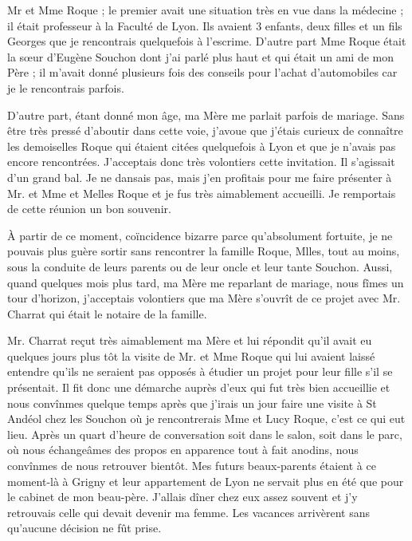 \documentclass[11pt,a4paper]{report}
\begin{document}
Mr et Mme Roque ; le premier avait une situation très en vue dans la médecine ; il était professeur à la Faculté de Lyon. Ils avaient 3 enfants, deux filles et un fils Georges que je rencontrais quelquefois à l'escrime. D'autre part Mme Roque était la sœur d'Eugène Souchon dont j'ai parlé plus haut et qui était un ami de mon Père ; il m'avait donné plusieurs fois des conseils pour l'achat d'automobiles car je le rencontrais parfois.

D'autre part, étant donné mon âge, ma Mère me parlait parfois de mariage. Sans être très pressé d'aboutir dans cette voie, j'avoue que j'étais curieux de connaître les demoiselles Roque qui étaient citées quelquefois à Lyon et que je n'avais pas encore rencontrées. J'acceptais donc très volontiers cette invitation. Il s'agissait d'un grand bal. Je ne dansais pas, mais j'en profitais pour me faire présenter à Mr. et Mme et Melles Roque et je fus très aimablement accueilli. Je remportais de cette réunion un bon souvenir.

À partir de ce moment, coïncidence bizarre parce qu'absolument fortuite, je ne pouvais plus guère sortir sans rencontrer la famille Roque, Mlles, tout au moins, sous la conduite de leurs parents ou de leur oncle et leur tante Souchon. Aussi, quand quelques mois plus tard, ma Mère me reparlant de mariage, nous fîmes un tour d'horizon, j'acceptais volontiers que ma Mère s'ouvrît de ce projet avec Mr. Charrat qui était le notaire de la famille.

Mr. Charrat reçut très aimablement ma Mère et lui répondit qu'il avait eu quelques jours plus tôt la visite de Mr. et Mme Roque qui lui avaient laissé entendre qu'ils ne seraient pas opposés à étudier un projet pour leur fille s'il se présentait. Il fit donc une démarche auprès d'eux qui fut très bien accueillie et nous convînmes quelque temps après que j'irais un jour faire une visite à St Andéol chez les Souchon où je rencontrerais Mme et Lucy Roque, c'est ce qui eut lieu. Après un quart d'heure de conversation soit dans le salon, soit dans le parc, où nous échangeâmes des propos en apparence tout à fait anodins, nous convînmes de nous retrouver bientôt. Mes futurs beaux-parents étaient à ce moment-là à Grigny et leur appartement de Lyon ne servait plus en été que pour le cabinet de mon beau-père. J'allais dîner chez eux assez souvent et j'y retrouvais celle qui devait devenir ma femme. Les vacances arrivèrent sans qu'aucune décision ne fût prise.
\end{document}
